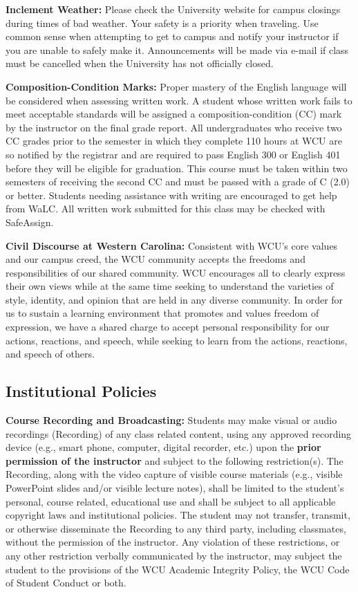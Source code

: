 \documentclass[]{tufte-book}
\begin{document}
\textbf{Inclement Weather:} Please check the University website for campus closings during times of bad weather. Your safety is a priority when traveling. Use common sense when attempting to get to campus and notify your instructor if you are unable to safely make it. Announcements will be made via e-mail if class must be cancelled when the University has not officially closed.

\textbf{Composition-Condition Marks:} Proper mastery of the English language will be considered when assessing written work. A student whose written work fails to meet acceptable standards will be assigned a composition-condition (CC) mark by the instructor on the final grade report. All undergraduates who receive two CC grades prior to the semester in which they complete 110 hours at WCU are so notified by the registrar and are required to pass English 300 or English 401 before they will be eligible for graduation. This course must be taken within two semesters of receiving the second CC and must be passed with a grade of C (2.0) or better. Students needing assistance with writing are encouraged to get help from WaLC. All written work submitted for this class may be checked with SafeAssign.

\textbf{Civil Discourse at Western Carolina:} Consistent with WCU's core values and our campus creed, the WCU community accepts the freedoms and responsibilities of our shared community. WCU encourages all to clearly express their own views while at the same time seeking to understand the varieties of style, identity, and opinion that are held in any diverse community. In order for us to sustain a learning environment that promotes and values freedom of expression, we have a shared charge to accept personal responsibility for our actions, reactions, and speech, while seeking to learn from the actions, reactions, and speech of others.

\hypertarget{institutional-policies}{%
\subsection*{Institutional Policies}\label{institutional-policies}}

\textbf{Course Recording and Broadcasting:} Students may make visual or audio recordings (Recording) of any class related content, using any approved recording device (e.g., smart phone, computer, digital recorder, etc.) upon the \textbf{prior permission of the instructor} and subject to the following restriction(s). The Recording, along with the video capture of visible course materials (e.g., visible PowerPoint slides and/or visible lecture notes), shall be limited to the student's personal, course related, educational use and shall be subject to all applicable copyright laws and institutional policies. The student may not transfer, transmit, or otherwise disseminate the Recording to any third party, including classmates, without the permission of the instructor. Any violation of these restrictions, or any other restriction verbally communicated by the instructor, may subject the student to the provisions of the WCU Academic Integrity Policy, the WCU Code of Student Conduct or both.
\end{document}
